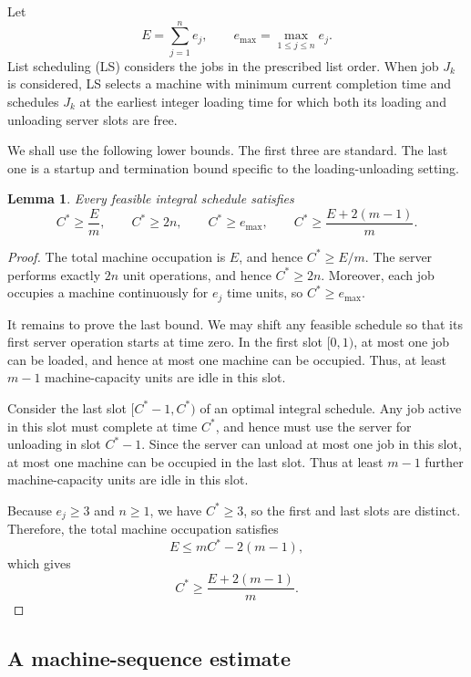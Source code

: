 \documentclass[11pt]{article}
\newtheorem{lemma}[theorem]{Lemma}
\begin{document}
Let
\[
E=\sum_{j=1}^{n}e_j,
\qquad
e_{\max}=\max_{1\le j\le n}e_j .
\]
List scheduling (LS) considers the jobs in the prescribed list order. When job
\(J_k\) is considered, LS selects a machine with minimum current completion time
and schedules \(J_k\) at the earliest integer loading time for which both its
loading and unloading server slots are free.

We shall use the following lower bounds. The first three are standard. The last
one is a startup and termination bound specific to the loading-unloading setting.

\begin{lemma}
\label{lem:ls-lower-bounds}
Every feasible integral schedule satisfies
\[
C^*\ge \frac{E}{m},
\qquad
C^*\ge 2n,
\qquad
C^*\ge e_{\max},
\qquad
C^*\ge \frac{E+2(m-1)}{m}.
\]
\end{lemma}

\begin{proof}
The total machine occupation is \(E\), and hence \(C^*\ge E/m\). The server
performs exactly \(2n\) unit operations, and hence \(C^*\ge 2n\). Moreover, each job
occupies a machine continuously for \(e_j\) time units, so \(C^*\ge e_{\max}\).

It remains to prove the last bound. We may shift any feasible schedule so that
its first server operation starts at time zero. In the first slot \([0,1)\), at
most one job can be loaded, and hence at most one machine can be occupied. Thus,
at least \(m-1\) machine-capacity units are idle in this slot.

Consider the last slot \([C^*-1,C^*)\) of an optimal integral schedule. Any job
active in this slot must complete at time \(C^*\), and hence must use the server
for unloading in slot \(C^*-1\). Since the server can unload at most one job in
this slot, at most one machine can be occupied in the last slot. Thus at least
\(m-1\) further machine-capacity units are idle in this slot.

Because \(e_j\ge 3\) and \(n\ge1\), we have \(C^*\ge3\), so the first and last
slots are distinct. Therefore, the total machine occupation satisfies
\[
E\le mC^*-2(m-1),
\]
which gives
\[
C^*\ge \frac{E+2(m-1)}{m}.
\]
\end{proof}

\subsection{A machine-sequence estimate}
\label{subsec:ls-single-chain-estimate}
\end{document}
